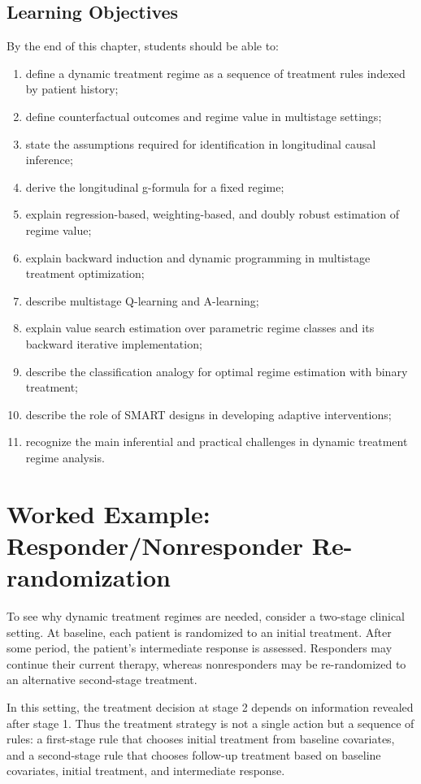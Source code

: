 \documentclass[master.tex]{subfiles}
\begin{document}
\subsection*{Learning Objectives}
By the end of this chapter, students should be able to:
\begin{enumerate}
    \item define a dynamic treatment regime as a sequence of treatment rules indexed by patient history;
    \item define counterfactual outcomes and regime value in multistage settings;
    \item state the assumptions required for identification in longitudinal causal inference;
    \item derive the longitudinal g-formula for a fixed regime;
    \item explain regression-based, weighting-based, and doubly robust estimation of regime value;
    \item explain backward induction and dynamic programming in multistage treatment optimization;
    \item describe multistage Q-learning and A-learning;
    \item explain value search estimation over parametric regime classes and its backward iterative implementation;
    \item describe the classification analogy for optimal regime estimation with binary treatment;
    \item describe the role of SMART designs in developing adaptive interventions;
    \item recognize the main inferential and practical challenges in dynamic treatment regime analysis.
\end{enumerate}

\section{Worked Example: Responder/Nonresponder Re-randomization}
\label{w15:sec:example}

To see why dynamic treatment regimes are needed, consider a two-stage clinical setting. At baseline, each patient is randomized to an initial treatment. After some period, the patient's intermediate response is assessed. Responders may continue their current therapy, whereas nonresponders may be re-randomized to an alternative second-stage treatment.

In this setting, the treatment decision at stage 2 depends on information revealed after stage 1. Thus the treatment strategy is not a single action but a sequence of rules: a first-stage rule that chooses initial treatment from baseline covariates, and a second-stage rule that chooses follow-up treatment based on baseline covariates, initial treatment, and intermediate response.
\end{document}
